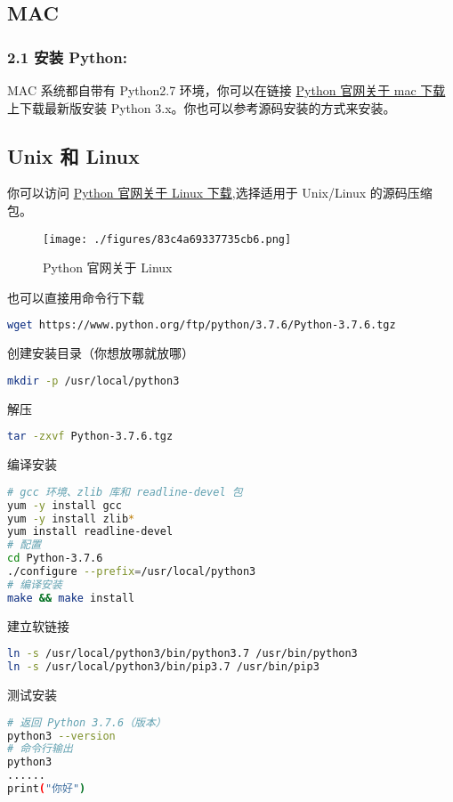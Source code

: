 \subsection{MAC}\label{sub_Pyc1_2}

\subsubsection{2.1 安装 Python:}
MAC 系统都自带有 Python2.7 环境，你可以在链接 \href{https://www.python.org/downloads/mac-osx/}{Python 官网关于 mac 下载} 上下载最新版安装 Python 3.x。你也可以参考源码安装的方式来安装。

\subsection{Unix 和 Linux}\label{sub_Pyc1_3} 

你可以访问 \href{https://www.python.org/downloads/source/}{Python 官网关于 Linux 下载},选择适用于 Unix/Linux 的源码压缩包。
\begin{figure}[ht]
\centering
\texttt{[image: ./figures/83c4a69337735cb6.png]}
\caption{Python 官网关于 Linux} \label{fig_Python_2}
\end{figure}

也可以直接用命令行下载
\begin{lstlisting}[language=bash]
wget https://www.python.org/ftp/python/3.7.6/Python-3.7.6.tgz
\end{lstlisting}

创建安装目录（你想放哪就放哪）
\begin{lstlisting}[language=bash]
mkdir -p /usr/local/python3
\end{lstlisting}

解压
\begin{lstlisting}[language=bash]
tar -zxvf Python-3.7.6.tgz
\end{lstlisting}

编译安装
\begin{lstlisting}[language=bash]
# gcc 环境、zlib 库和 readline-devel 包
yum -y install gcc
yum -y install zlib*
yum install readline-devel
# 配置
cd Python-3.7.6
./configure --prefix=/usr/local/python3
# 编译安装
make && make install
\end{lstlisting}

建立软链接
\begin{lstlisting}[language=bash]
ln -s /usr/local/python3/bin/python3.7 /usr/bin/python3
ln -s /usr/local/python3/bin/pip3.7 /usr/bin/pip3
\end{lstlisting}

测试安装
\begin{lstlisting}[language=bash]
# 返回 Python 3.7.6（版本）
python3 --version
# 命令行输出
python3
......
print("你好")
\end{lstlisting}






